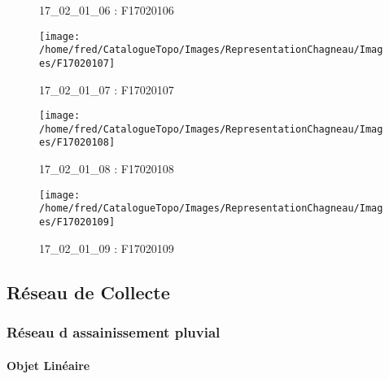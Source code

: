 \documentclass[12pt,titlepage,oneside]{book}
\begin{document}
\begin{figure}[h!]
\begin{minipage}[t]{3cm}
\begin{center}
      \caption[F17020106]{\label{} 17\_02\_01\_06 : F17020106}
    \end{center}
  \end{minipage}
  \begin{minipage}[t]{3cm}
    \begin{center}
      \texttt{[image: /home/fred/CatalogueTopo/Images/RepresentationChagneau/Images/F17020107]}
      \caption[F17020107]{\label{} 17\_02\_01\_07 : F17020107}
    \end{center}
  \end{minipage}
  \begin{minipage}[t]{3cm}
    \begin{center}
      \texttt{[image: /home/fred/CatalogueTopo/Images/RepresentationChagneau/Images/F17020108]}
      \caption[F17020108]{\label{} 17\_02\_01\_08 : F17020108}
    \end{center}
  \end{minipage}
  \begin{minipage}[t]{3cm}
    \begin{center}
      \texttt{[image: /home/fred/CatalogueTopo/Images/RepresentationChagneau/Images/F17020109]}
      \caption[F17020109]{\label{} 17\_02\_01\_09 : F17020109}
    \end{center}
  \end{minipage}
\end{figure}
\subsection{Réseau de Collecte}
\subsubsection{\large Réseau d assainissement pluvial}
\paragraph{Objet Linéaire}
\noindent
\vspace{\baselineskip}
\end{document}
